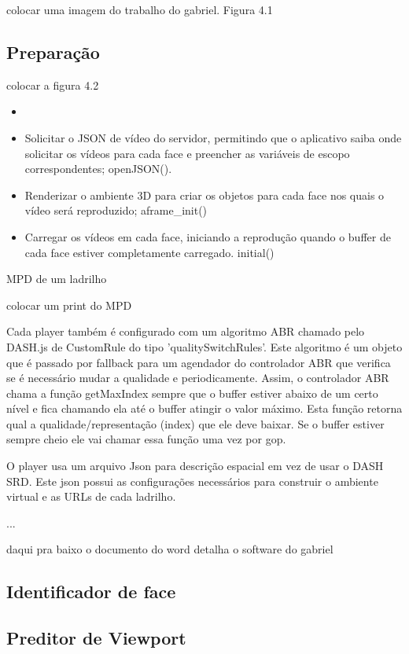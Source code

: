 colocar uma imagem do trabalho do gabriel. Figura 4.1

\subsection{Preparação}

colocar a figura 4.2

\begin{itemize}
	\item 
	\item Solicitar o JSON de vídeo do servidor, permitindo que o aplicativo saiba onde solicitar os vídeos para cada face e preencher as variáveis de escopo correspondentes; openJSON(). 
	\item Renderizar o ambiente 3D para criar os objetos para cada face nos quais o vídeo será reproduzido; aframe_init()
	\item Carregar os vídeos em cada face, iniciando a reprodução quando o buffer de cada face estiver completamente carregado. initial()
\end{itemize}

MPD de um ladrilho

colocar um print do MPD

Cada player também é configurado com um algoritmo ABR chamado pelo DASH.js de CustomRule do tipo 'qualitySwitchRules'. Este algoritmo é um objeto que é passado por fallback para um agendador do controlador ABR que verifica se é necessário mudar a qualidade e periodicamente. Assim, o controlador ABR chama a função getMaxIndex sempre que o buffer estiver abaixo de um certo nível e fica chamando ela até o buffer atingir o valor máximo. Esta função retorna qual a qualidade/representação (index) que ele deve baixar. Se o buffer estiver sempre cheio ele vai chamar essa função uma vez por gop.

O player usa um arquivo Json para descrição espacial em vez de usar o DASH SRD. Este json possui as configurações necessários para construir o ambiente virtual e as URLs de cada ladrilho.



...

daqui pra baixo o documento do word detalha o software do gabriel

\subsection{Identificador de face}


\subsection{Preditor de Viewport}

